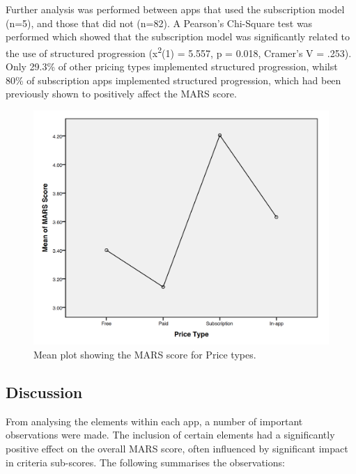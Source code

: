 Further analysis was performed between apps that used the subscription model (n=5), and those that did not (n=82). A Pearson's Chi-Square test was performed which showed that the subscription model was significantly related to the use of structured progression (x\textsuperscript{2}(1) = 5.557, p = 0.018, Cramer's V = .253). Only 29.3\% of other pricing types implemented structured progression, whilst 80\% of subscription apps implemented structured progression, which had been previously shown to positively affect the MARS score.

\begin{figure}[h]
    \centering
    \includegraphics[scale=0.40, angle=0]{Files/prevention-study-1/figures/pricetype-mars-anova}
    \caption{Mean plot showing the MARS score for Price types.}
    \label{fig: pricetype-mars-anova}
\end{figure}

\subsection{Discussion} \label{subsection: MARS-discussion}
From analysing the elements within each app, a number of important observations were made. The inclusion of certain elements had a significantly positive effect on the overall MARS score, often influenced by significant impact in criteria sub-scores. The following summarises the observations:


